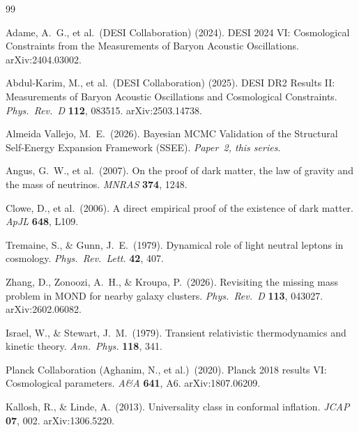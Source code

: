 \documentclass[12pt,a4paper]{article}
\begin{document}
\clearpage

\begin{thebibliography}{99}

Adame, A.~G., et al.\ (DESI Collaboration) (2024).
DESI 2024 VI: Cosmological Constraints from the Measurements of Baryon
Acoustic Oscillations.
arXiv:2404.03002.

Abdul-Karim, M., et al.\ (DESI Collaboration) (2025).
DESI DR2 Results II: Measurements of Baryon Acoustic Oscillations and Cosmological Constraints.
\textit{Phys.\ Rev.\ D} \textbf{112}, 083515.
arXiv:2503.14738.

Almeida Vallejo, M.~E.\ (2026).
Bayesian MCMC Validation of the Structural Self-Energy Expansion Framework (SSEE).
\textit{Paper~2, this series}.

Angus, G.~W., et al.\ (2007).
On the proof of dark matter, the law of gravity and the mass of neutrinos.
\textit{MNRAS} \textbf{374}, 1248.

Clowe, D., et al.\ (2006).
A direct empirical proof of the existence of dark matter.
\textit{ApJL} \textbf{648}, L109.

Tremaine, S., \& Gunn, J.~E.\ (1979).
Dynamical role of light neutral leptons in cosmology.
\textit{Phys.\ Rev.\ Lett.} \textbf{42}, 407.

Zhang, D., Zonoozi, A.~H., \& Kroupa, P.\ (2026).
Revisiting the missing mass problem in MOND for nearby galaxy clusters.
\textit{Phys.\ Rev.\ D} \textbf{113}, 043027.
arXiv:2602.06082.

Israel, W., \& Stewart, J.~M.\ (1979).
Transient relativistic thermodynamics and kinetic theory.
\textit{Ann.\ Phys.} \textbf{118}, 341.

Planck Collaboration (Aghanim, N., et al.)\ (2020).
Planck 2018 results VI: Cosmological parameters.
\textit{A\&A} \textbf{641}, A6.
arXiv:1807.06209.

Kallosh, R., \& Linde, A.\ (2013).
Universality class in conformal inflation.
\textit{JCAP} \textbf{07}, 002.
arXiv:1306.5220.


\end{thebibliography}
\end{document}
